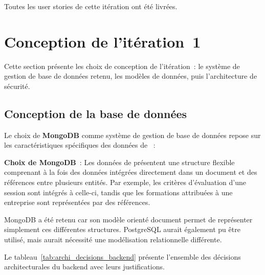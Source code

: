 \noindent Toutes les user stories de cette itération ont été livrées.

\section{Conception de l'itération~1}

Cette section présente les choix de conception de l'itération~: le système de gestion
de base de données retenu, les modèles de données, puis l'architecture de sécurité.

\subsection{Conception de la base de données}

Le choix de \textbf{MongoDB} comme système de gestion de base de données repose sur
les caractéristiques spécifiques des données de \tynassit{}~:

\begin{archbox}

  \textbf{Choix de MongoDB}~: Les données de \tynassit{} présentent une structure
  flexible comprenant à la fois des données intégrées directement dans un document
  et des références entre plusieurs entités. Par exemple, les critères d'évaluation
  d'une session sont intégrés à celle-ci, tandis que les formations attribuées à une
  entreprise sont représentées par des références.

  MongoDB a été retenu car son modèle orienté document permet de représenter
  simplement ces différentes structures. PostgreSQL aurait également pu être utilisé,
  mais aurait nécessité une modélisation relationnelle différente.

\end{archbox}

Le tableau~\ref{tab:archi_decisions_backend} présente l'ensemble des décisions
architecturales du backend avec leurs justifications.

